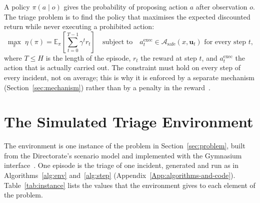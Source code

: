 A policy $\pi(a \mid o)$ gives the probability of proposing action $a$ after observation $o$. The triage problem is to find the policy that maximises the expected discounted return while never executing a prohibited action:
\begin{equation}
\max_{\pi} \; \eta(\pi) = \mathbb{E}_{\pi}\!\left[ \sum_{t=0}^{T-1} \gamma^{t} r_t \right]
\quad \text{subject to} \quad
a^{\text{exec}}_t \in \mathcal{A}_{\text{safe}}(x, \mathbf{u}_t) \text{ for every step } t,
\label{eq:objective}
\end{equation}
where $T \le H$ is the length of the episode, $r_t$ the reward at step $t$, and $a^{\text{exec}}_t$ the action that is actually carried out. The constraint must hold on every step of every incident, not on average; this is why it is enforced by a separate mechanism (Section~\ref{sec:mechanism}) rather than by a penalty in the reward~\cite{zhao2023,konighofer2025}.

\section{The Simulated Triage Environment}
\label{sec:environment}

The environment is one instance of the problem in Section~\ref{sec:problem}, built from the Directorate's scenario model and implemented with the Gymnasium interface~\cite{towers2024}. One episode is the triage of one incident, generated and run as in Algorithms~\ref{alg:env} and~\ref{alg:step} (Appendix~\ref{App:algorithms-and-code}). Table~\ref{tab:instance} lists the values that the environment gives to each element of the problem.

